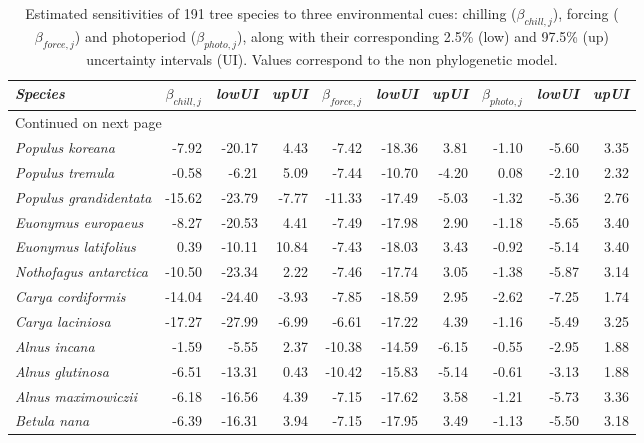 \documentclass[11pt]{article}
\begin{document}
\begin{longtable}{lrrrrrrrrr}
\caption{Estimated sensitivities of 191 tree species to three environmental cues: chilling ($\beta_{chill,j}$), forcing ($\beta_{force,j}$) and photoperiod ($\beta_{photo,j}$), along with their corresponding 2.5\% (low) and 97.5\% (up) uncertainty intervals (UI). Values correspond to the non phylogenetic model.} \\ 
  \hline
\emph{Species} & \emph{$\beta_{chill,j}$} & \emph{lowUI} & \emph{upUI} & \emph{$\beta_{force,j}$} & \emph{lowUI} & \emph{upUI} & \emph{$\beta_{photo,j}$} & \emph{lowUI} & \emph{upUI} \\ 
  \hline
\endhead
\hline
\multicolumn{10}{l}{\footnotesize Continued on next page}
\endfoot
\endlastfoot
 \hline
\emph{Populus deltoides} & -18.11 & -28.51 & -7.77 & -6.23 & -15.95 & 4.03 & -1.26 & -5.84 & 3.32 \\ 
  \emph{Populus koreana} & -7.92 & -20.17 & 4.43 & -7.42 & -18.36 & 3.81 & -1.10 & -5.60 & 3.35 \\ 
  \emph{Populus tremula} & -0.58 & -6.21 & 5.09 & -7.44 & -10.70 & -4.20 & 0.08 & -2.10 & 2.32 \\ 
  \emph{Populus grandidentata} & -15.62 & -23.79 & -7.77 & -11.33 & -17.49 & -5.03 & -1.32 & -5.36 & 2.76 \\ 
  \emph{Euonymus europaeus} & -8.27 & -20.53 & 4.41 & -7.49 & -17.98 & 2.90 & -1.18 & -5.65 & 3.40 \\ 
  \emph{Euonymus latifolius} & 0.39 & -10.11 & 10.84 & -7.43 & -18.03 & 3.43 & -0.92 & -5.14 & 3.40 \\ 
  \emph{Nothofagus antarctica} & -10.50 & -23.34 & 2.22 & -7.46 & -17.74 & 3.05 & -1.38 & -5.87 & 3.14 \\ 
  \emph{Carya cordiformis} & -14.04 & -24.40 & -3.93 & -7.85 & -18.59 & 2.95 & -2.62 & -7.25 & 1.74 \\ 
  \emph{Carya laciniosa} & -17.27 & -27.99 & -6.99 & -6.61 & -17.22 & 4.39 & -1.16 & -5.49 & 3.25 \\ 
  \emph{Alnus incana} & -1.59 & -5.55 & 2.37 & -10.38 & -14.59 & -6.15 & -0.55 & -2.95 & 1.88 \\ 
  \emph{Alnus glutinosa} & -6.51 & -13.31 & 0.43 & -10.42 & -15.83 & -5.14 & -0.61 & -3.13 & 1.88 \\ 
  \emph{Alnus maximowiczii} & -6.18 & -16.56 & 4.39 & -7.15 & -17.62 & 3.58 & -1.21 & -5.73 & 3.36 \\ 
  \emph{Betula nana} & -6.39 & -16.31 & 3.94 & -7.15 & -17.95 & 3.49 & -1.13 & -5.50 & 3.18 \\ 

\end{longtable}
\end{document}
